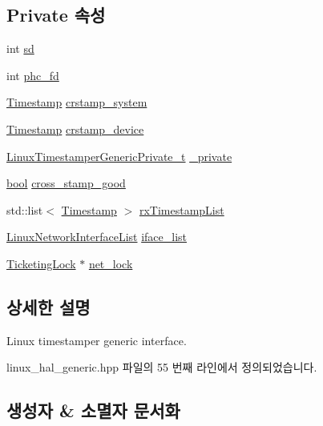 \subsection*{Private 속성}
\begin{DoxyCompactItemize}
\item 
int \hyperlink{class_linux_timestamper_generic_a06b0afe769d54ae94259d8532bc878b0}{sd}
\item 
int \hyperlink{class_linux_timestamper_generic_ac4500de48048f43e4cfd225a42c8bd56}{phc\+\_\+fd}
\item 
\hyperlink{class_timestamp}{Timestamp} \hyperlink{class_linux_timestamper_generic_a885b6a10ac960ef4f2028df1c19c3022}{crstamp\+\_\+system}
\item 
\hyperlink{class_timestamp}{Timestamp} \hyperlink{class_linux_timestamper_generic_a64ea949cc4e9e1d47f6e27a68add3888}{crstamp\+\_\+device}
\item 
\hyperlink{linux__hal__generic_8hpp_a2fb0f94dd96c52ad8f39f8585babaa35}{Linux\+Timestamper\+Generic\+Private\+\_\+t} \hyperlink{class_linux_timestamper_generic_a5522acc6ce53752665fa393702058a7b}{\+\_\+private}
\item 
\hyperlink{avb__gptp_8h_af6a258d8f3ee5206d682d799316314b1}{bool} \hyperlink{class_linux_timestamper_generic_a44ccbbc368595932d5247f158b0c902e}{cross\+\_\+stamp\+\_\+good}
\item 
std\+::list$<$ \hyperlink{class_timestamp}{Timestamp} $>$ \hyperlink{class_linux_timestamper_generic_a3ab5f699ce3a90c21782087bdae99de9}{rx\+Timestamp\+List}
\item 
\hyperlink{linux__hal__common_8hpp_abe97282bb5495e1b6f0db75e51cde87e}{Linux\+Network\+Interface\+List} \hyperlink{class_linux_timestamper_generic_a71c6eb5a2c243c3e622503aa7c0eff67}{iface\+\_\+list}
\item 
\hyperlink{class_ticketing_lock}{Ticketing\+Lock} $\ast$ \hyperlink{class_linux_timestamper_generic_a9a02854f530a2e2f70741e2970ea1fd5}{net\+\_\+lock}
\end{DoxyCompactItemize}


\subsection{상세한 설명}
Linux timestamper generic interface. 

linux\+\_\+hal\+\_\+generic.\+hpp 파일의 55 번째 라인에서 정의되었습니다.



\subsection{생성자 \& 소멸자 문서화}

